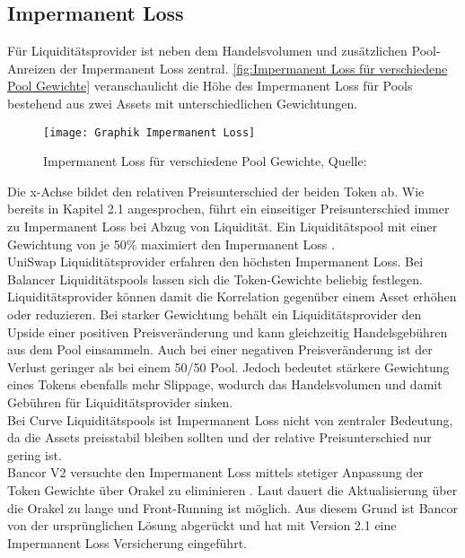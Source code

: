 \documentclass[12pt,a4paper,titlepage,oneside,english]{article}
\begin{document}
\subsection{Impermanent Loss}
Für Liquiditätsprovider ist neben dem Handelsvolumen und zusätzlichen Pool-Anreizen %
der Impermanent Loss zentral.
\autoref{fig:Impermanent Loss für verschiedene Pool Gewichte} veranschaulicht die Höhe des Impermanent Loss für Pools bestehend aus zwei Assets mit unterschiedlichen Gewichtungen.
	\begin{figure}[h!]
	\begin{center}
	\texttt{[image: Graphik Impermanent Loss]}
	\caption{Impermanent Loss für verschiedene Pool Gewichte, Quelle: \citet{Martinelli8020}}\label{fig:Impermanent Loss für verschiedene Pool Gewichte}
	\end{center}
	\end{figure}
\newpage
Die x-Achse bildet den relativen Preisunterschied der beiden Token ab. Wie bereits in Kapitel 2.1 angesprochen, führt ein einseitiger Preisunterschied immer zu Impermanent Loss bei Abzug von Liquidität. Ein Liquiditätspool mit einer Gewichtung von je 50\% maximiert den Impermanent Loss \citep{Martinelli8020}.\\
UniSwap Liquiditätsprovider erfahren den höchsten Impermanent Loss.
Bei Balancer Liquiditätspools lassen sich die Token-Gewichte beliebig festlegen. Liquiditätsprovider können damit die Korrelation gegenüber einem Asset erhöhen oder reduzieren.  Bei starker Gewichtung behält ein Liquiditätsprovider den Upside einer positiven Preisveränderung und kann gleichzeitig Handelsgebühren aus dem Pool einsammeln. Auch bei einer negativen Preisveränderung ist der Verlust geringer als bei einem 50/50 Pool.  
Jedoch bedeutet stärkere Gewichtung eines Tokens ebenfalls mehr Slippage, wodurch das Handelsvolumen und damit Gebühren für Liquiditätsprovider sinken. \citep[vgl.][]{Martinelli8020} \\
Bei Curve Liquiditätspools ist Impermanent Loss nicht von zentraler Bedeutung, da die Assets preisstabil bleiben sollten und der relative Preisunterschied nur gering ist. \\ Bancor V2 versuchte den Impermanent Loss mittels stetiger Anpassung der Token Gewichte über Orakel zu eliminieren \citep{Chainlink2020}. Laut \citet{Shevchenko2020} dauert die Aktualisierung über die Orakel zu lange und Front-Running ist möglich. Aus diesem Grund ist Bancor von der ursprünglichen Lösung abgerückt und hat mit Version 2.1 eine Impermanent Loss Versicherung eingeführt.
\end{document}
